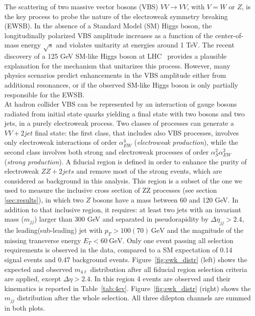 The scattering of two massive vector bosons (VBS) $VV\to VV$, with $V=W$ or $Z$, is the key process to probe the nature of the electroweak symmetry breaking (EWSB). In the absence of a Standard Model (SM) Higgs boson, the longitudinally polarized VBS amplitude increases as a function of the center-of-mass energy $\sqrt{s}$ and violates unitarity at energies around 1 TeV. The recent discovery of a 125 GeV SM-like Higgs boson at LHC~\cite{AtlasHiggs, CMSHiggs} provides a plausible explanation for the mechanism that unitarizes this process. However, many physics scenarios predict enhancements in the VBS amplitude either from additional resonances, or if the observed SM-like Higgs boson is only partially responsible for the EWSB.\\
At hadron collider VBS can be represented by an interaction of gauge bosons radiated from initial state quarks yielding a final state with two bosons and two jets, in a purely electroweak process. Two classes of processes can generate a $VV + 2 jet$ final state: the first class, that includes also VBS processes, involves only electroweak interactions of order $\alpha_{EW}^{4}$ (\emph{electroweak production}), while the second class involves both strong and electroweak processes of order $\alpha_{S}^{2}\alpha_{EW}^{2}$ (\emph{strong production}). A fiducial region is defined in order to enhance the purity of electroweak $ZZ+2jets$ and remove most of the strong events, which are considered as background in this analysis. This region is a subset of the one we used to measure the inclusive cross section of ZZ processes (see section \ref{sec:results}), in which two $Z$ bosons have a mass between 60 and 120 GeV. In addition to that inclusive region, it requires: at least two jets with an invariant mass ($m_{jj}$) larger than 300 GeV and separated in pseudorapidity by $\Delta\eta_{jj} > 2.4$, the leading(sub-leading) jet with $p_T>100(70)~\mathrm{GeV}$ and the magnitude of the missing transverse energy $E_T < 60~\mathrm{GeV}$. Only one event passing all selection requirements is observed in the data, compared to a SM expectation of 0.14 signal events and 0.47 background events. Figure~\ref{fig:ewk_distr} (left) shows the expected and observed $m_{4\ell}$ distribution after all fiducial region selection criteria are applied, except $\Delta\eta > 2.4$. In this region 4 events are observed and their kinematics is reported in Table~\ref{tab:4ev}. Figure~\ref{fig:ewk_distr} (right) shows the $m_{jj}$ distribution after the whole selection. All three dilepton channels are summed in both plots.
